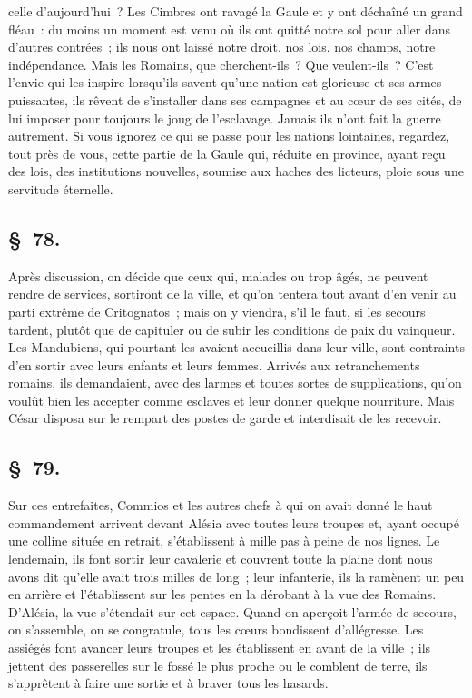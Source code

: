 \documentclass[french,twoside]{book} %
\begin{document}
celle d’aujourd’hui ? Les Cimbres ont ravagé la Gaule et y ont déchaîné un grand fléau : du moins un moment est venu où ils ont quitté notre sol pour aller dans d’autres contrées ; ils nous ont laissé notre droit, nos lois, nos champs, notre indépendance. Mais les Romains, que cherchent-ils ? Que veulent-ils ? C'est l’envie qui les inspire lorsqu’ils savent qu’une nation est glorieuse et ses armes puissantes, ils rêvent de s’installer dans ses campagnes et au cœur de ses cités, de lui imposer pour toujours le joug de l’esclavage. Jamais ils n’ont fait la guerre autrement. Si vous ignorez ce qui se passe pour les nations lointaines, regardez, tout près de vous, cette partie de la Gaule qui, réduite en province, ayant reçu des lois, des institutions nouvelles, soumise aux haches des licteurs, ploie sous une servitude éternelle.
\subsection[{§ 78.}]{ \textsc{§ 78.} }
\noindent Après discussion, on décide que ceux qui, malades ou trop âgés, ne peuvent rendre de services, sortiront de la ville, et qu’on tentera tout avant d’en venir au parti extrême de Critognatos ; mais on y viendra, s’il le faut, si les secours tardent, plutôt que de capituler ou de subir les conditions de paix du vainqueur. Les Mandubiens, qui pourtant les avaient accueillis dans leur ville, sont contraints d’en sortir avec leurs enfants et leurs femmes. Arrivés aux retranchements romains, ils demandaient, avec des larmes et toutes sortes de supplications, qu’on voulût bien les accepter comme esclaves et leur donner quelque nourriture. Mais César disposa sur le rempart des postes de garde et interdisait de les recevoir.
\subsection[{§ 79.}]{ \textsc{§ 79.} }
\noindent Sur ces entrefaites, Commios et les autres chefs à qui on avait donné le haut commandement arrivent devant Alésia avec toutes leurs troupes et, ayant occupé une colline située en retrait, s’établissent à mille pas à peine de nos lignes. Le lendemain, ils font sortir leur cavalerie et couvrent toute la plaine dont nous avons dit qu’elle avait trois milles de long ; leur infanterie, ils la ramènent un peu en arrière et l’établissent sur les pentes en la dérobant à la vue des Romains. D'Alésia, la vue s’étendait sur cet espace. Quand on aperçoit l’armée de secours, on s’assemble, on se congratule, tous les cœurs bondissent d’allégresse. Les assiégés font avancer leurs troupes et les établissent en avant de la ville ; ils jettent des passerelles sur le fossé le plus proche ou le comblent de terre, ils s’apprêtent à faire une sortie et à braver tous les hasards.
\end{document}
